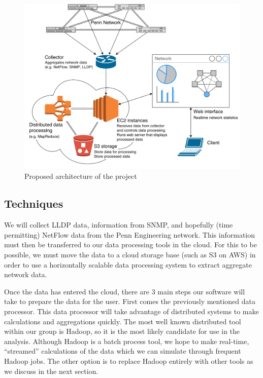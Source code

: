 \documentclass{sig-alternate}
\begin{document}
\begin{figure}[htb!]
    \centering
    \includegraphics[width=\linewidth]{mockup}
    \caption{Proposed architecture of the project}
    \label{fig:mockup}
\end{figure}

\subsection{Techniques}

We will collect LLDP data, information from SNMP, and hopefully (time
permitting) NetFlow data from the Penn Engineering network. This information
must then be transferred to our data processing tools in the cloud. For this to
be possible, we must move the data to a cloud storage base (such as S3 on AWS)
in order to use a horizontally scalable data processing system to extract
aggregate network data.

Once the data has entered the cloud, there are 3 main steps our software will
take to prepare the data for the user. First comes the previously mentioned data
processor. This data processor will take advantage of distributed systems to
make calculations and aggregations quickly. The most well known distributed tool
within our group is Hadoop, so it is the most likely candidate for use in the
analysis. Although Hadoop is a batch process tool, we hope to make real-time,
``streamed'' calculations of the data which we can simulate through frequent
Hadoop jobs. The other option is to replace Hadoop entirely with other tools as
we discuss in the next section.
\end{document}
